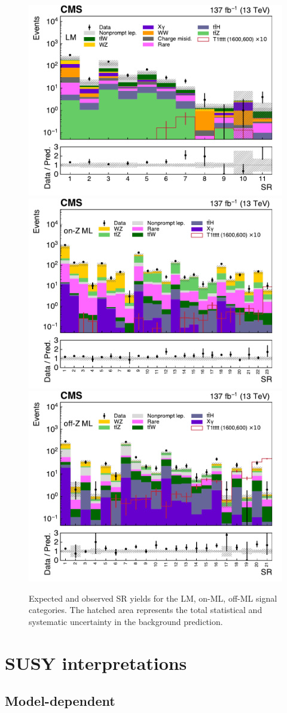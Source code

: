 \begin{figure}[!hbtp]
\centering
\includegraphics[width=.50\textwidth]{figs/ssp/SRLM_TOTAL.pdf}
\includegraphics[width=.50\textwidth]{figs/ssp/SRMLONZ_TOTAL.pdf}
\includegraphics[width=.50\textwidth]{figs/ssp/SRMLOFFZ_TOTAL.pdf}
\\
\caption{Expected and observed SR yields for the LM, on-\PZ ML, off-\PZ ML signal categories. 
The hatched area represents the total statistical and systematic uncertainty in the background prediction.
}
\label{fig:SRrun2b}
\end{figure}


                               

\section{SUSY interpretations}
\label{sec:ssinterpretations}

\subsection{Model-dependent}

